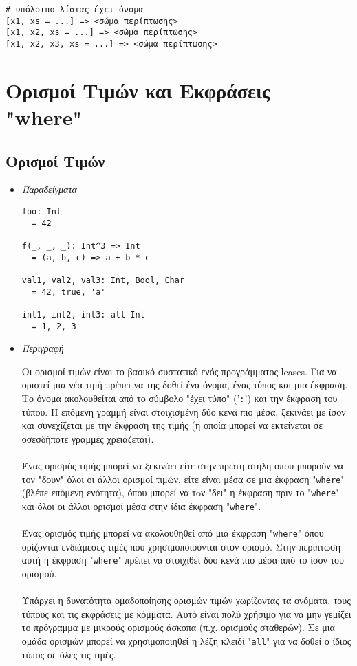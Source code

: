 \documentclass[diploma]{softlab-thesis}
\begin{document}
\begin{itemize}
\begin{verbatim}
# υπόλοιπο λίστας έχει όνομα
[x1, xs = ...] => <σώμα περίπτωσης>
[x1, x2, xs = ...] => <σώμα περίπτωσης>
[x1, x2, x3, xs = ...] => <σώμα περίπτωσης>
\end{verbatim}

\end{itemize}

\newpage
\section{Ορισμοί Τιμών και Εκφράσεις "where"}
\label{subsec:valdefswheregr}

\subsection{Ορισμοί Τιμών}

\begin{itemize}

\item \textit{Παραδείγματα}

\begin{verbatim}
foo: Int
  = 42

f(_, _, _): Int^3 => Int
  = (a, b, c) => a + b * c

val1, val2, val3: Int, Bool, Char
  = 42, true, 'a'

int1, int2, int3: all Int
  = 1, 2, 3
\end{verbatim}

\item \textit{Περιγραφή}

Οι ορισμοί τιμών είναι το βασικό συστατικό ενός προγράμματος lcases. Για να
οριστεί μια νέα τιμή πρέπει να της δοθεί ένα όνομα, ένας τύπος και μια έκφραση.
Το όνομα ακολουθείται από το σύμβολο "έχει τύπο" ('\verb|:|') και την έκφραση
του τύπου. Η επόμενη γραμμή είναι στοιχισμένη δύο κενά πιο μέσα,
ξεκινάει με ίσον και συνεχίζεται με την έκφραση της τιμής (η οποία μπορεί
να εκτείνεται σε οσεσδήποτε γραμμές χρειάζεται).
\\\\
Ένας ορισμός τιμής μπορεί να ξεκινάει είτε στην πρώτη στήλη όπου μπορούν να τον
"δουν" όλοι οι άλλοι ορισμοί τιμών, είτε είναι μέσα σε μια έκφραση
"\verb|where|" (βλέπε επόμενη ενότητα), όπου μπορεί να τoν "δει" η έκφραση πριν
το "\verb|where|" και όλοι οι άλλοι ορισμοί μέσα στην ίδια έκφραση
"\verb|where|".
\\\\
Ένας ορισμός τιμής μπορεί να ακολουθηθεί από μια έκφραση "\verb|where|" όπου
ορίζονται ενδιάμεσες τιμές που χρησιμοποιούνται στον ορισμό. Στην περίπτωση
αυτή η έκφραση "\verb|where|" πρέπει να στοιχιθεί δύο κενά πιο μέσα από το
ίσον του ορισμού.
\\\\
Υπάρχει η δυνατότητα ομαδοποίησης ορισμών τιμών χωρίζοντας τα ονόματα, τους
τύπους και τις εκφράσεις με κόμματα. Αυτό είναι πολύ χρήσιμο για να μην
γεμίζει το πρόγραμμα με μικρούς ορισμούς άσκοπα (π.χ. ορισμούς σταθερών).
Σε μια ομάδα ορισμών μπορεί να χρησιμοποιηθεί η λέξη κλειδί "\verb|all|"
για να δοθεί ο ίδιος τύπος σε όλες τις τιμές.

\end{itemize}
\end{document}
